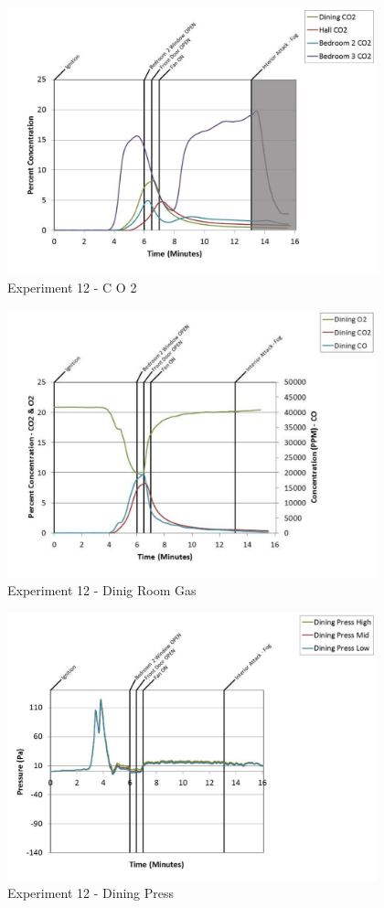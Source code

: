 \documentclass{article}
\begin{document}
\begin{appendices}
	\clearpage

	\begin{figure}[h!]
		\centering
		\includegraphics[height=3.05in]{0_Images/Results_Charts/Exp_12_Charts/CO2.pdf}
		\caption{Experiment 12 - C O 2}
	\end{figure}
 

	\begin{figure}[h!]
		\centering
		\includegraphics[height=3.05in]{0_Images/Results_Charts/Exp_12_Charts/DinigRoomGas.pdf}
		\caption{Experiment 12 - Dinig Room Gas}
	\end{figure}
 
	\clearpage

	\begin{figure}[h!]
		\centering
		\includegraphics[height=3.05in]{0_Images/Results_Charts/Exp_12_Charts/DiningPress.pdf}
		\caption{Experiment 12 - Dining Press}
	\end{figure}
 


\end{appendices}
\end{document}
